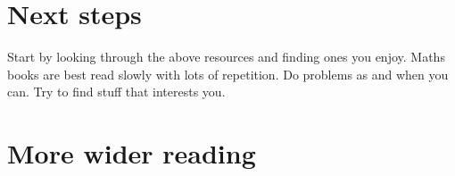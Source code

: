 \documentclass[11pt]{article}
\newif\ifshowpersonal
\newcommand{\personal}[1]{\ifshowpersonal\textcolor{myorange}{\emph{#1}}\fi}
\begin{document}
\section{Next steps}

Start by looking through the above resources and finding ones you enjoy. Maths books are best read slowly with lots of repetition. Do problems as and when you can. Try to find stuff that interests you. 



\vspace{2cm}

\personal{While I’ve tried to present this as objectively as possible, bear in mind that it’s all based on my experience. I came 15\textsuperscript{th} in my year and I’m now going on to a PhD — but I wasn’t always the strongest student. I wasn’t even close to the top of my class until Year 13. What changed was that I started to take maths seriously — and I began working on it outside school during the summer after GCSEs. Honestly, I haven’t worked particularly hard at university. Most of what’s helped me through has been reading small bits for pleasure in the holidays. An love of the subject will get you much, much further (eventually) than any kind of natural talent or ability.}


\appendix

\section{More wider reading}\label{sec:morebooks}

\personal{I think I might have flicked through a couple of these but I don't think I seriously read any of them so can't comment on how good they are!}
\end{document}
